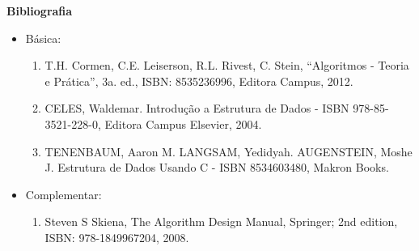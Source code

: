 

\begin{snugshade}\begin{center}\textbf{
    Bibliografia
}\end{center}\end{snugshade}

\begin{itemize} 
  \item Básica:
	\begin{enumerate}
	\item T.H. Cormen, C.E. Leiserson, R.L. Rivest, C. Stein, ``Algoritmos - Teoria e Prática'', 3a. ed., ISBN: 8535236996, Editora Campus, 2012.
	\item CELES, Waldemar. Introdução a Estrutura de Dados -  ISBN 978-85-3521-228-0, Editora Campus Elsevier, 2004.
	\item TENENBAUM, Aaron M. LANGSAM, Yedidyah. AUGENSTEIN, Moshe J. Estrutura de Dados Usando C - ISBN 8534603480, Makron Books. 
	
	\end{enumerate}
  \item Complementar:
	\begin{enumerate} 
	\item Steven S Skiena, The Algorithm Design Manual, Springer; 2nd edition, ISBN: 978-1849967204, 2008.\\
	\end{enumerate}
\end{itemize}
